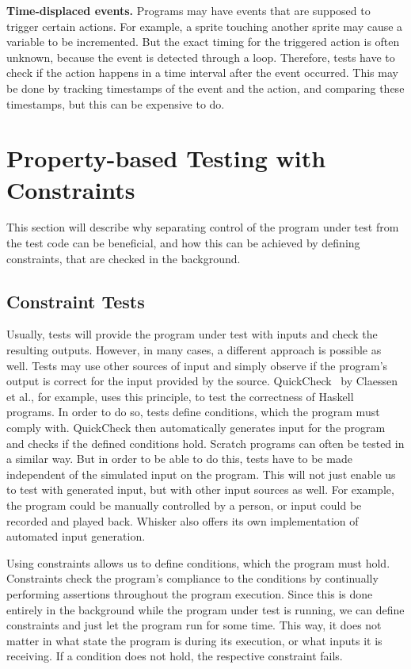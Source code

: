 \textbf{Time-displaced events.}
Programs may have events that are supposed to trigger certain actions.
For example, a sprite touching another sprite may cause a variable to be incremented.
But the exact timing for the triggered action is often unknown, because the event is detected through a loop.
Therefore, tests have to check if the action happens in a time interval after the event occurred.
This may be done by tracking timestamps of the event and the action, and comparing these timestamps,
but this can be expensive to do.
\parspace

\chapter{Property-based Testing with Constraints}
\label{cha:using_constraints_for_flexible_test_inputs}

This section will describe why separating control of the program under test from the test code can be beneficial,
and how this can be achieved by defining constraints, that are checked in the background.

\section{Constraint Tests}
\label{sec:input_independent_constraint_only_tests}

Usually, tests will provide the program under test with inputs and check the resulting outputs.
However, in many cases, a different approach is possible as well.
Tests may use other sources of input and simply observe if the program's output is correct for the input provided by the source.
QuickCheck~\cite{quickcheck} by Claessen et al., for example, uses this principle, to test the correctness of Haskell programs.
In order to do so, tests define conditions, which the program must comply with.
QuickCheck then automatically generates input for the program and checks if the defined conditions hold.
Scratch programs can often be tested in a similar way.
But in order to be able to do this, tests have to be made independent of the simulated input on the program.
This will not just enable us to test with generated input, but with other input sources as well.
For example, the program could be manually controlled by a person, or input could be recorded and played back.
Whisker also offers its own implementation of automated input generation.
\parspace

Using constraints allows us to define conditions, which the program must hold.
Constraints check the program's compliance to the conditions by continually performing assertions throughout the program execution.
Since this is done entirely in the background while the program under test is running, we can define constraints and just let the program run for some time.
This way, it does not matter in what state the program is during its execution, or what inputs it is receiving.
If a condition does not hold, the respective constraint fails.

